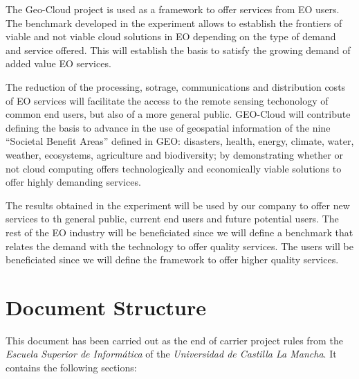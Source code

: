 The Geo-Cloud project is used as a framework to offer services from \ac{EO}
users. The benchmark developed in the experiment allows to establish the
frontiers of viable and not viable cloud solutions in \ac{EO} depending on the
type of demand and service offered. This will establish the basis to satisfy the
growing demand of added value \ac{EO} services.

The reduction of the processing, sotrage, communications and distribution costs
of \ac{EO} services will facilitate the access to the remote sensing techonology of
common end users, but also of a more general public. GEO-Cloud will contribute
defining the basis to advance in the use of geospatial information of the nine
``Societal Benefit Areas'' defined in GEO: disasters, health, energy, climate,
water, weather, ecosystems, agriculture and biodiversity; by demonstrating
whether or not cloud computing offers technologically and economically viable
solutions to offer highly demanding services.

The results obtained in the experiment will be used by our company to offer new
services to th general public, current end users and future potential users. The
rest of the \ac{EO} industry will be beneficiated since we will define a
benchmark that relates the demand with the technology to offer quality
services. The users will be beneficiated since we will define the framework to
offer higher quality services.




\section{Document Structure}

This document has been carried out as the end of carrier project rules from the \emph{Escuela
Superior de Informática} of the \emph{Universidad de Castilla La Mancha}. It contains
the following sections:


